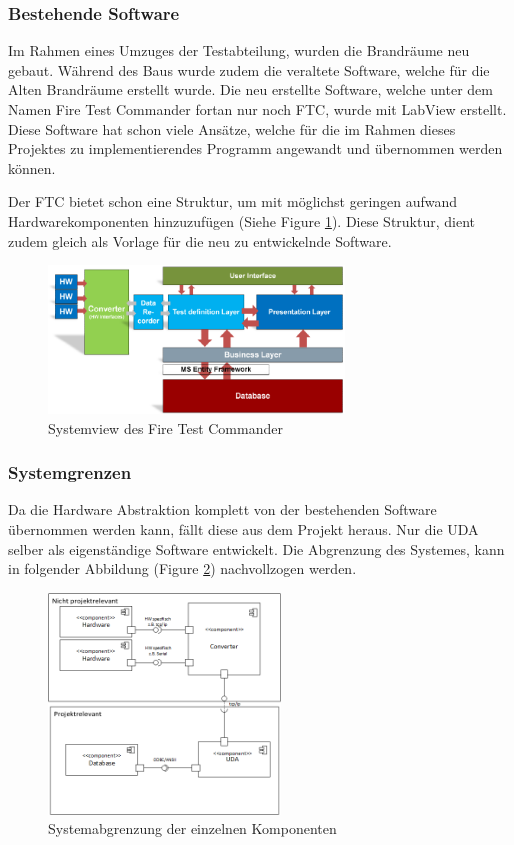 \documentclass[10pt]{scrartcl}
\begin{document}
\subsubsection{Bestehende Software}
Im Rahmen eines Umzuges der Testabteilung, wurden die Brandräume neu gebaut. Während des Baus wurde zudem die veraltete Software, welche für die Alten Brandräume erstellt wurde. Die neu erstellte Software, welche unter dem Namen Fire Test Commander fortan nur noch FTC, wurde mit LabView erstellt. Diese Software hat schon viele Ansätze, welche für die im Rahmen dieses Projektes zu implementierendes Programm angewandt und übernommen werden können.

Der FTC bietet schon eine Struktur, um mit möglichst geringen aufwand Hardwarekomponenten hinzuzufügen (Siehe Figure \ref{fig:SystemViewFTC}). Diese Struktur, dient zudem gleich als Vorlage für die neu zu entwickelnde Software.
\begin{figure}[htbp] 
	\centering
	\includegraphics[width=0.7\textwidth]{SystemviewFTC}
	\caption{Systemview des Fire Test Commander}
	\label{fig:SystemViewFTC}
\end{figure}

\subsubsection{Systemgrenzen}
Da die Hardware Abstraktion komplett von der bestehenden Software übernommen werden kann, fällt diese aus dem Projekt heraus. Nur die UDA selber als eigenständige Software entwickelt. Die Abgrenzung des Systemes, kann in folgender Abbildung (Figure \ref{fig:SystemView}) nachvollzogen werden.
\begin{figure}[htbp] 
	\centering
	\includegraphics[width=0.55\textwidth]{Systemgrenzen}
	\caption{Systemabgrenzung der einzelnen Komponenten}
	\label{fig:SystemView}
\end{figure}
\end{document}
